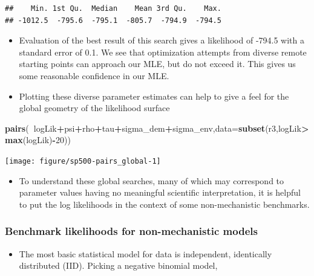 \documentclass[]{article}
\newenvironment{Shaded}{\begin{snugshade}}{\end{snugshade}}
\newcommand{\KeywordTok}[1]{\textcolor[rgb]{0.13,0.29,0.53}{\textbf{#1}}}
\newcommand{\DataTypeTok}[1]{\textcolor[rgb]{0.13,0.29,0.53}{#1}}
\newcommand{\DecValTok}[1]{\textcolor[rgb]{0.00,0.00,0.81}{#1}}
\newcommand{\OperatorTok}[1]{\textcolor[rgb]{0.81,0.36,0.00}{\textbf{#1}}}
\newcommand{\NormalTok}[1]{#1}
\providecommand{\tightlist}{%
  \setlength{\itemsep}{0pt}\setlength{\parskip}{0pt}}
\begin{document}
\begin{verbatim}
##    Min. 1st Qu.  Median    Mean 3rd Qu.    Max. 
## -1012.5  -795.6  -795.1  -805.7  -794.9  -794.5
\end{verbatim}

\begin{itemize}
\item
  Evaluation of the best result of this search gives a likelihood of
  -794.5 with a standard error of 0.1. We see that optimization attempts
  from diverse remote starting points can approach our MLE, but do not
  exceed it. This gives us some reasonable confidence in our MLE.
\item
  Plotting these diverse parameter estimates can help to give a feel for
  the global geometry of the likelihood surface
\end{itemize}

\begin{Shaded}
\begin{Highlighting}[]
\KeywordTok{pairs}\NormalTok{(}\OperatorTok{~}\NormalTok{logLik}\OperatorTok{+}\NormalTok{psi}\OperatorTok{+}\NormalTok{rho}\OperatorTok{+}\NormalTok{tau}\OperatorTok{+}\NormalTok{sigma_dem}\OperatorTok{+}\NormalTok{sigma_env,}\DataTypeTok{data=}\KeywordTok{subset}\NormalTok{(r3,logLik}\OperatorTok{>}\KeywordTok{max}\NormalTok{(logLik)}\OperatorTok{-}\DecValTok{20}\NormalTok{))}
\end{Highlighting}
\end{Shaded}

\begin{center}\texttt{[image: figure/sp500-pairs\_global-1]} \end{center}

\begin{itemize}
\tightlist
\item
  To understand these global searches, many of which may correspond to
  parameter values having no meaningful scientific interpretation, it is
  helpful to put the log likelihoods in the context of some
  non-mechanistic benchmarks.
\end{itemize}

\subsubsection{Benchmark likelihoods for non-mechanistic
models}\label{benchmark-likelihoods-for-non-mechanistic-models}

\begin{itemize}
\tightlist
\item
  The most basic statistical model for data is independent, identically
  distributed (IID). Picking a negative binomial model,
\end{itemize}
\end{document}
